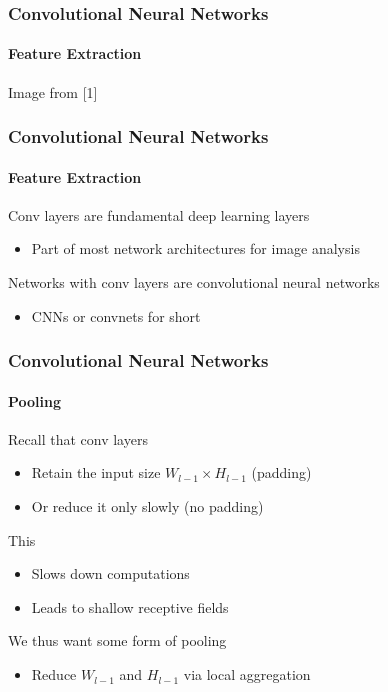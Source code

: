 \documentclass[xetex,professionalfont]{beamer}
\renewcommand\emph[1]{\textcolor{tuwcvl_cvl_blue}{#1}}
\begin{document}
\begin{frame}
\frametitle{Convolutional Neural Networks}
\framesubtitle{Feature Extraction}

\begin{center}
{\centering Image from [1]}
\end{center}

\end{frame}


\begin{frame}
\frametitle{Convolutional Neural Networks}
\framesubtitle{Feature Extraction}

Conv layers are fundamental deep learning layers
\begin{itemize}
    \item Part of most network architectures for image analysis %
\end{itemize}

\bigskip

Networks with conv layers are \emph{convolutional neural networks}
\begin{itemize}
    \item \emph{CNNs} or \emph{convnets} for short
\end{itemize}

\end{frame}


\begin{frame}
\frametitle{Convolutional Neural Networks}
\framesubtitle{Pooling}

Recall that conv layers
\begin{itemize}
    \item Retain the input size $W_{l-1}\times H_{l-1}$ (padding)
    \item Or reduce it only slowly (no padding) %
\end{itemize}

\bigskip

This
\begin{itemize}
    \item Slows down computations %
    \item Leads to shallow receptive fields %
\end{itemize}

\bigskip

We thus want some form of \emph{pooling} %
\begin{itemize}
    \item Reduce $W_{l-1}$ and $H_{l-1}$ via local aggregation %
\end{itemize}

\end{frame}
\end{document}
